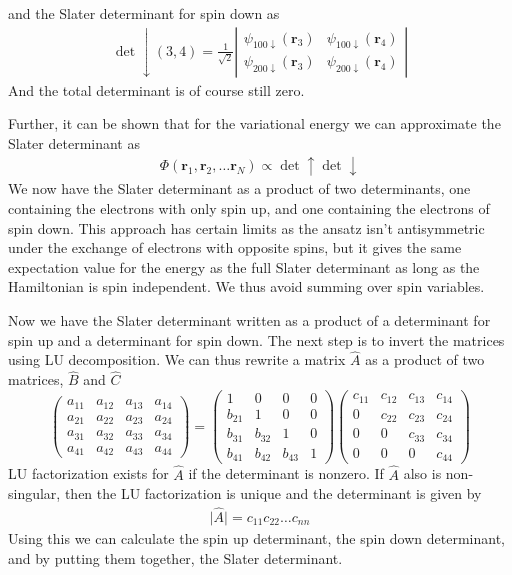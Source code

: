 			and the Slater determinant for spin down as
			\begin{align}
				\det\downarrow(3,4)=\frac{1}{\sqrt{2}}\left|\begin{array}{cc}
				\psi_{100\downarrow}(\mathbf{r}_{3}) & \psi_{100\downarrow}(\mathbf{r}_{4})\\
				\psi_{200\downarrow}(\mathbf{r}_{3}) & \psi_{200\downarrow}(\mathbf{r}_{4})
				\end{array}\right|
			\end{align}
			And the total determinant is of course still zero.

			Further, it can be shown that for the variational energy we can approximate
			the Slater determinant as
			\begin{align}
				\Phi(\mathbf{r}_{1},\mathbf{r}_{2},\dots\mathbf{r}_{N})\propto\det\uparrow\det\downarrow
			\end{align}
			We now have the Slater determinant as a product of two determinants,
			one containing the electrons with only spin up, and one containing
			the electrons of spin down. This approach has certain limits as the
			ansatz isn't antisymmetric under the exchange of electrons with opposite
			spins, but it gives the same expectation value for the energy as the
			full Slater determinant as long as the Hamiltonian is spin independent.
			We thus avoid summing over spin variables.

			Now we have the Slater determinant written as a product of a determinant
			for spin up and a determinant for spin down. The next step is to invert
			the matrices using LU decomposition. We can thus rewrite a matrix
			$\hat{A}$ as a product of two matrices, $\hat{B}$ and $\hat{C}$
			\[
			\left(\begin{array}{cccc}
			a_{11} & a_{12} & a_{13} & a_{14}\\
			a_{21} & a_{22} & a_{23} & a_{24}\\
			a_{31} & a_{32} & a_{33} & a_{34}\\
			a_{41} & a_{42} & a_{43} & a_{44}
			\end{array}\right)=\left(\begin{array}{cccc}
			1 & 0 & 0 & 0\\
			b_{21} & 1 & 0 & 0\\
			b_{31} & b_{32} & 1 & 0\\
			b_{41} & b_{42} & b_{43} & 1
			\end{array}\right)\left(\begin{array}{cccc}
			c_{11} & c_{12} & c_{13} & c_{14}\\
			0 & c_{22} & c_{23} & c_{24}\\
			0 & 0 & c_{33} & c_{34}\\
			0 & 0 & 0 & c_{44}
			\end{array}\right)
			\]
			LU factorization exists for $\hat{A}$ if the determinant is nonzero.
			If $\hat{A}$ also is non-singular, then the LU factorization is unique
			and the determinant is given by
			\begin{align}
				\vert\hat{A}\vert=c_{11}c_{22}\dots c_{nn}
			\end{align}
			Using this we can calculate the spin up determinant, the spin down
			determinant, and by putting them together, the Slater determinant.
